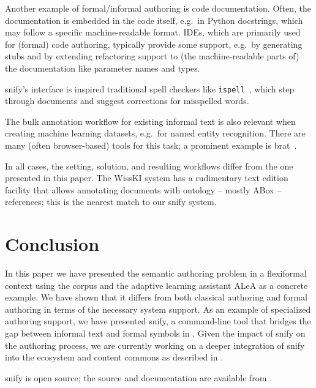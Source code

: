 \documentclass[runningheads]{llncs}
\newcommand\ALeA{\textsf{ALeA}\xspace}
\newcommand\snify{\textsf{snify}\xspace}
\begin{document}
Another example of formal/informal authoring is code documentation.
Often, the documentation is embedded in the code itself,
e.g.\ in Python docstrings, which may follow a specific
machine-readable format.
IDEs, which are primarily used for (formal) code authoring,
typically provide some support, e.g.\ by generating stubs
and by extending refactoring support
to (the machine-readable parts of) the documentation
like parameter names and types.

\snify's interface is inspired traditional spell checkers
like \lstinline|ispell|~\cite{ispellman},
which step through documents and suggest corrections for misspelled words.

The bulk annotation workflow for existing informal text is also relevant when creating
machine learning datasets, e.g.\ for named entity recognition.  There are many (often
browser-based) tools for this task; a prominent example is
\textsf{brat}~\cite{brat:on}.

In all cases, the setting, solution, and resulting workflows differ from the one presented
in this paper. The WissKI system \cite{goerz2010adaptation} has a rudimentary text edition
facility that allows annotating documents with ontology -- mostly ABox -- references; this
is the nearest match to our \snify system.

\section{Conclusion}\label{sec:conclusion}
In this paper we have presented the semantic authoring problem in a flexiformal context
using the \sTeX corpus and the adaptive learning assistant \ALeA as a concrete example. We
have shown that it differs from both classical authoring and formal authoring in terms of
the necessary system support. As an example of specialized authoring support, we have
presented \snify, a command-line tool that bridges the gap between informal text and
formal symbols in \sTeX.  Given the impact of \snify on the authoring process, we are
currently working on a deeper integration of \snify into the \sTeX ecosystem and content
commons as described in . 

\snify is open source; the source and documentation are available from
\cite{stextools:git}.
\end{document}
